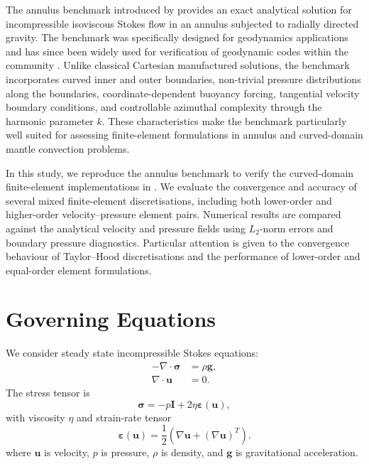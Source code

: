\documentclass[gmd, manuscript]{copernicus}
\begin{document}
The annulus benchmark introduced by  provides an exact analytical solution
for incompressible isoviscous Stokes flow in an annulus subjected to
radially directed gravity. The benchmark was specifically designed for
geodynamics applications and has since been widely used for verification of
geodynamic codes within the community \citep{gassmoller2024}. Unlike classical
Cartesian manufactured solutions, the benchmark incorporates curved inner and
outer boundaries, non-trivial pressure distributions along the boundaries,
coordinate-dependent buoyancy forcing, tangential velocity boundary conditions,
and controllable azimuthal complexity through the harmonic parameter \(k\).
These characteristics make the benchmark particularly well suited for assessing
finite-element formulations in annulus and curved-domain mantle convection
problems.

In this study, we reproduce the  annulus
benchmark to verify the curved-domain finite-element implementations in
. We
evaluate the convergence and accuracy of several mixed finite-element
discretisations, including both lower-order and higher-order
velocity--pressure element pairs. Numerical results are compared against the
analytical velocity and pressure fields using \(L_2\)-norm errors and
boundary pressure diagnostics. Particular attention is given to the convergence
behaviour of Taylor--Hood discretisations and the performance of lower-order and
equal-order element formulations.

\section{Governing Equations}

We consider steady state incompressible Stokes equations:
\begin{subequations}
\begin{align}
  -\nabla \cdot \boldsymbol{\sigma} &= \rho \mathbf{g}, \\
  \nabla \cdot \mathbf{u} &= 0.
\end{align}
\end{subequations}
The stress tensor is
\begin{equation}
  \boldsymbol{\sigma} = -p\mathbf{I} + 2\eta\boldsymbol{\varepsilon}(\mathbf{u}),
\end{equation}
with viscosity \(\eta\) and strain-rate tensor
\begin{equation}
  \boldsymbol{\varepsilon}(\mathbf{u})
  =
  \frac{1}{2}\left(\nabla \mathbf{u} + (\nabla \mathbf{u})^T\right).
\end{equation}
where \(\mathbf{u}\) is velocity, \(p\) is pressure, \(\rho\) is density, and \(\mathbf{g}\) is gravitational acceleration.
\end{document}
